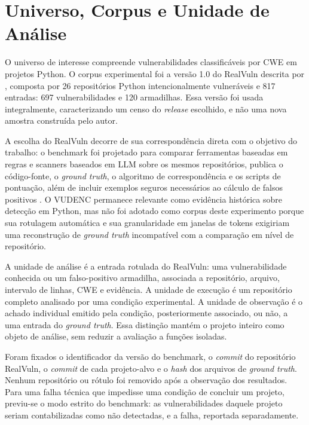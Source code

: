 \section{Universo, Corpus e Unidade de Análise}\label{sec:universo-amostra}

O universo de interesse compreende vulnerabilidades classificáveis por CWE em projetos Python. O corpus experimental foi a versão 1.0 do RealVuln descrita por , composta por 26 repositórios Python intencionalmente vulneráveis e 817 entradas: 697 vulnerabilidades e 120 armadilhas. Essa versão foi usada integralmente, caracterizando um censo do \textit{release} escolhido, e não uma nova amostra construída pelo autor.

A escolha do RealVuln decorre de sua correspondência direta com o objetivo do trabalho: o benchmark foi projetado para comparar ferramentas baseadas em regras e scanners baseados em LLM sobre os mesmos repositórios, publica o código-fonte, o \textit{ground truth}, o algoritmo de correspondência e os scripts de pontuação, além de incluir exemplos seguros necessários ao cálculo de falsos positivos \cite{Pellew2026RealVuln}. O VUDENC permanece relevante como evidência histórica sobre detecção em Python, mas não foi adotado como corpus deste experimento porque sua rotulagem automática e sua granularidade em janelas de tokens exigiriam uma reconstrução de \textit{ground truth} incompatível com a comparação em nível de repositório.

A unidade de análise é a entrada rotulada do RealVuln: uma vulnerabilidade conhecida ou um falso-positivo armadilha, associada a repositório, arquivo, intervalo de linhas, CWE e evidência. A unidade de execução é um repositório completo analisado por uma condição experimental. A unidade de observação é o achado individual emitido pela condição, posteriormente associado, ou não, a uma entrada do \textit{ground truth}. Essa distinção mantém o projeto inteiro como objeto de análise, sem reduzir a avaliação a funções isoladas.

Foram fixados o identificador da versão do benchmark, o \textit{commit} do repositório RealVuln, o \textit{commit} de cada projeto-alvo e o \textit{hash} dos arquivos de \textit{ground truth}. Nenhum repositório ou rótulo foi removido após a observação dos resultados. Para uma falha técnica que impedisse uma condição de concluir um projeto, previu-se o modo estrito do benchmark: as vulnerabilidades daquele projeto seriam contabilizadas como não detectadas, e a falha, reportada separadamente.

